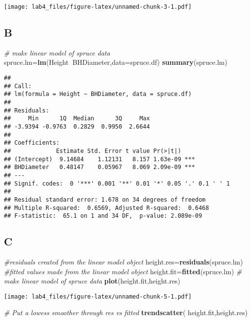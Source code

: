 \documentclass[]{article}
\newenvironment{Shaded}{\begin{snugshade}}{\end{snugshade}}
\newcommand{\KeywordTok}[1]{\textcolor[rgb]{0.13,0.29,0.53}{\textbf{#1}}}
\newcommand{\DataTypeTok}[1]{\textcolor[rgb]{0.13,0.29,0.53}{#1}}
\newcommand{\CommentTok}[1]{\textcolor[rgb]{0.56,0.35,0.01}{\textit{#1}}}
\newcommand{\OperatorTok}[1]{\textcolor[rgb]{0.81,0.36,0.00}{\textbf{#1}}}
\newcommand{\NormalTok}[1]{#1}
\begin{document}
\texttt{[image: lab4\_files/figure-latex/unnamed-chunk-3-1.pdf]}

\subsection{B}\label{b}

\begin{Shaded}
\begin{Highlighting}[]
\CommentTok{# make linear model  of spruce data}
\NormalTok{spruce.lm=}\KeywordTok{lm}\NormalTok{(Height}\OperatorTok{~}\NormalTok{BHDiameter,}\DataTypeTok{data=}\NormalTok{spruce.df)}
\KeywordTok{summary}\NormalTok{(spruce.lm)}
\end{Highlighting}
\end{Shaded}

\begin{verbatim}
## 
## Call:
## lm(formula = Height ~ BHDiameter, data = spruce.df)
## 
## Residuals:
##     Min      1Q  Median      3Q     Max 
## -3.9394 -0.9763  0.2829  0.9950  2.6644 
## 
## Coefficients:
##             Estimate Std. Error t value Pr(>|t|)    
## (Intercept)  9.14684    1.12131   8.157 1.63e-09 ***
## BHDiameter   0.48147    0.05967   8.069 2.09e-09 ***
## ---
## Signif. codes:  0 '***' 0.001 '**' 0.01 '*' 0.05 '.' 0.1 ' ' 1
## 
## Residual standard error: 1.678 on 34 degrees of freedom
## Multiple R-squared:  0.6569, Adjusted R-squared:  0.6468 
## F-statistic:  65.1 on 1 and 34 DF,  p-value: 2.089e-09
\end{verbatim}

\subsection{C}\label{c}

\begin{Shaded}
\begin{Highlighting}[]
\CommentTok{#residuals  created from the linear model object}
\NormalTok{height.res=}\KeywordTok{residuals}\NormalTok{(spruce.lm)}
\CommentTok{#fitted values made from the linear model object}
\NormalTok{height.fit=}\KeywordTok{fitted}\NormalTok{(spruce.lm)}
\CommentTok{# make linear model  of spruce data}
\KeywordTok{plot}\NormalTok{(height.fit,height.res)}
\end{Highlighting}
\end{Shaded}

\texttt{[image: lab4\_files/figure-latex/unnamed-chunk-5-1.pdf]}

\begin{Shaded}
\begin{Highlighting}[]
\CommentTok{# Put a lowess smoother through res vs fitted}
\KeywordTok{trendscatter}\NormalTok{( height.fit,height.res)}
\end{Highlighting}
\end{Shaded}
\end{document}
